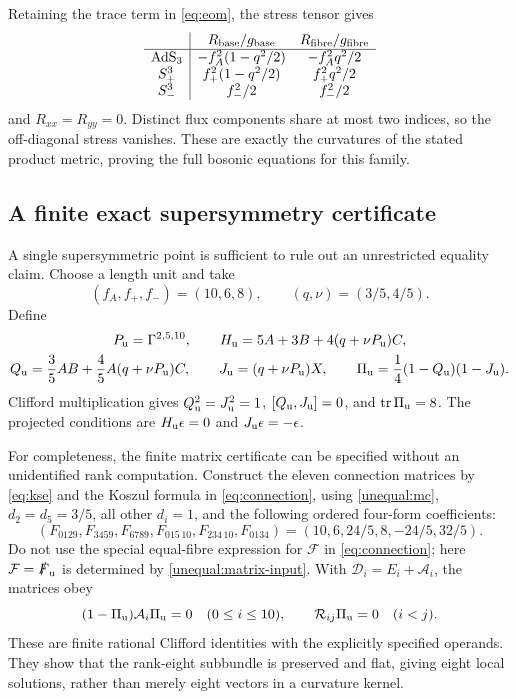 Retaining the trace term in \eqref{eq:eom}, the stress tensor gives
\begin{equation}
\begin{array}{c|cc}
 &R_{\rm base}/g_{\rm base}&R_{\rm fibre}/g_{\rm fibre}\\ \hline
\mathrm{AdS}_3&-f_A^2(1-q^2/2)&-f_A^2q^2/2\\
S^3_+&f_+^2(1-q^2/2)&f_+^2q^2/2\\
S^3_-&f_-^2/2&f_-^2/2
\end{array}
\end{equation}
and $R_{xx}=R_{yy}=0$. Distinct flux components share at most two indices, so the off-diagonal stress vanishes. These are exactly the curvatures of the stated product metric, proving the full bosonic equations for this family.

\subsection{A finite exact supersymmetry certificate}
A single supersymmetric point is sufficient to rule out an unrestricted equality claim. Choose a length unit and take
\begin{equation}
(f_A,f_+,f_-)=(10,6,8),\qquad (q,\nu)=(3/5,4/5).
\label{unequal:point}
\end{equation}
Define
\begin{gather}
P_{\rm u}=\Gamma^{2,5,10},\qquad
H_{\rm u}=5A+3B+4(q+\nu P_{\rm u})C,\notag\\
Q_{\rm u}=\frac35AB+\frac45A(q+\nu P_{\rm u})C,\qquad
J_{\rm u}=(q+\nu P_{\rm u})X,\qquad
\Pi_{\rm u}=\frac14(1-Q_{\rm u})(1-J_{\rm u}).
\label{unequal:projector}
\end{gather}
Clifford multiplication gives $Q_{\rm u}^2=J_{\rm u}^2=1$, $[Q_{\rm u},J_{\rm u}]=0$, and $\operatorname{tr}\Pi_{\rm u}=8$. The projected conditions are $H_{\rm u}\epsilon=0$ and $J_{\rm u}\epsilon=-\epsilon$.

For completeness, the finite matrix certificate can be specified without an unidentified rank computation. Construct the eleven connection matrices by \eqref{eq:kse} and the Koszul formula in \eqref{eq:connection}, using \eqref{unequal:mc}, $d_2=d_5=3/5$, all other $d_i=1$, and the following ordered four-form coefficients:
\begin{equation}
(F_{0129},F_{3459},F_{6789},F_{015\,10},F_{234\,10},F_{0134})
=(10,6,24/5,8,-24/5,32/5).
\label{unequal:matrix-input}
\end{equation}
Do not use the special equal-fibre expression for $\mathcal F$ in \eqref{eq:connection}; here $\mathcal F=\slashed F_{\rm u}$ is determined by \eqref{unequal:matrix-input}. With $\mathscr D_i=E_i+\mathcal A_i$, the matrices obey
\begin{equation}
(1-\Pi_{\rm u})\mathcal A_i\Pi_{\rm u}=0\quad(0\leq i\leq10),
\qquad \mathcal R_{ij}\Pi_{\rm u}=0\quad(i<j).
\label{unequal:flatness}
\end{equation}
These are finite rational Clifford identities with the explicitly specified operands. They show that the rank-eight subbundle is preserved and flat, giving eight local solutions, rather than merely eight vectors in a curvature kernel.

